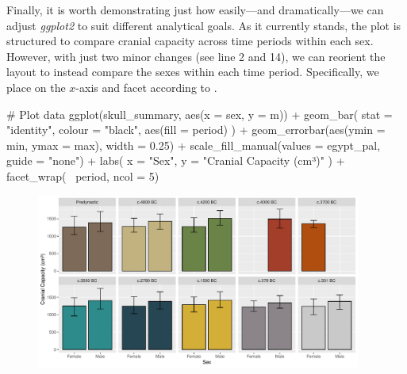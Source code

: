 Finally, it is worth demonstrating just how easily—and dramatically—we can adjust \textit{ggplot2} to suit different analytical goals. As it currently stands, the plot is structured to compare cranial capacity across time periods within each sex. However, with just two minor changes (see line 2 and 14), we can reorient the layout to instead compare the sexes within each time period. Specifically, we place  on the $x$-axis and facet according to .


\begin{inR}
# Plot data
ggplot(skull_summary, aes(x = sex, y = m)) +
  geom_bar(
    stat = "identity",
    colour = "black",
    aes(fill = period)
  ) +
  geom_errorbar(aes(ymin = min, ymax = max), width = 0.25) +
  scale_fill_manual(values = egypt_pal, guide = "none") +
  labs(
    x = "Sex",
    y = "Cranial Capacity (cm³)"
  ) +
  facet_wrap(~ period, ncol = 5)
\end{inR}

\vspace{2em}

\begin{figure}[H]
\includegraphics[width = 0.95\textwidth]{graphics/ch3Figs/bar_9.pdf}
\end{figure}